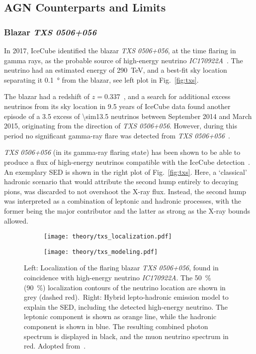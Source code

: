 \subsection{AGN Counterparts and Limits}

\subsubsection{Blazar \emph{TXS 0506+056}}
In 2017, IceCube identified the blazar \emph{TXS 0506+056}, at the time flaring in gamma rays, as the probable source of high-energy neutrino \emph{IC170922A}~. The neutrino had an estimated energy of \SI{290}{\tera\eV}, and a best-fit sky location separating it \SI{0.1}{\degree} from the blazar, see left plot in Fig.~\ref{fig:txs}.

The blazar had a redshift of $z=0.337$~, and a search for additional excess neutrinos from its sky location in 9.5 years of IceCube data found another episode of a \SI{3.5}{\sigma} excess of \num{\sim13.5} neutrinos between September 2014 and March 2015, originating from the direction of \emph{TXS 0506+056}. However, during this period no significant gamma-ray flare was detected from \emph{TXS 0506+056}~.

\emph{TXS 0506+056} (in its gamma-ray flaring state) has been shown to be able to produce a flux of high-energy neutrinos compatible with the IceCube detection~. An exemplary SED is shown in the right plot of Fig.~\ref{fig:txs}. Here, a `classical' hadronic scenario that would attribute the second hump entirely to decaying pions, was discarded to not overshoot the X-ray flux. Instead, the second hump was interpreted as a combination of leptonic and hadronic processes, with the former being the major contributor and the latter as strong as the X-ray bounds allowed.

\begin{figure}[htb]
  \centering
  \begin{subfigure}[b]{0.47\textwidth}
    \centering
    \texttt{[image: theory/txs\_localization.pdf]}
  \end{subfigure}
  \begin{subfigure}[b]{0.52\textwidth}
    \centering
    \texttt{[image: theory/txs\_modeling.pdf]}
  \end{subfigure}
  \caption[\textit{TXS 0506+056}: Localization and SED]{Left: Localization of the flaring blazar \emph{TXS 0506+056}, found in coincidence with high-energy neutrino \emph{IC170922A}. The \SI{50}{\percent} (\SI{90}{\percent}) localization contours of the neutrino location are shown in grey (dashed red).\ Right: Hybrid lepto-hadronic emission model to explain the SED, including the detected high-energy neutrino. The leptonic component is shown as orange line, while the hadronic component is shown in blue. The resulting combined photon spectrum is displayed in black, and the muon neutrino spectrum in red. Adopted from~\cite{Aartsen2018, Gao2018}.}
\end{figure}

